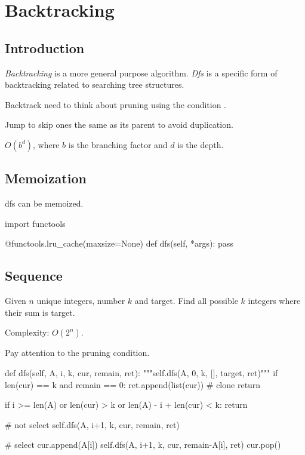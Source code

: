 \chapter{Backtracking}
\section{Introduction}
 \textit{Backtracking} is a more general purpose algorithm. \textit{Dfs} is a specific form of backtracking related to searching tree structures. 

 Backtrack need to think about pruning using the condition .

 Jump to skip ones the same as its parent to avoid duplication.

 $O(b^d)$, where $b$ is the branching factor and $d$ is the depth. 


\section{Memoization}
dfs can be memoized.
\begin{python}
import functools

@functools.lru_cache(maxsize=None)
def dfs(self, *args):
  pass
\end{python}
\section{Sequence}
 Given $n$ unique integers, number $k$ and target. Find all possible $k$ integers where their sum is target. 

Complexity: $O(2^n)$.

Pay attention to the pruning condition.

\begin{python}
def dfs(self, A, i, k, cur, remain, ret):
    """self.dfs(A, 0, k, [], target, ret)"""
    if len(cur) == k and remain == 0:
        ret.append(list(cur))  # clone 
        return

    if i >= len(A) or len(cur) > k 
       or len(A) - i + len(cur) < k:
        return
	
	# not select 
    self.dfs(A, i+1, k, cur, remain, ret)
    
    # select
    cur.append(A[i])
    self.dfs(A, i+1, k, cur, remain-A[i], ret)
    cur.pop()
\end{python}


